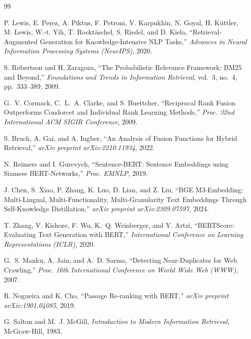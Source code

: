 \documentclass[12pt, a4paper]{article}
\begin{document}
\newpage
\begin{thebibliography}{99}

P. Lewis, E. Perez, A. Piktus, F. Petroni, V. Karpukhin, N. Goyal, H. K{\"u}ttler,
M. Lewis, W.-t. Yih, T. Rockt{\"a}schel, S. Riedel, and D. Kiela,
``Retrieval-Augmented Generation for Knowledge-Intensive NLP Tasks,''
\textit{Advances in Neural Information Processing Systems (NeurIPS)}, 2020.

S. Robertson and H. Zaragoza,
``The Probabilistic Relevance Framework: BM25 and Beyond,''
\textit{Foundations and Trends in Information Retrieval},
vol.~3, no.~4, pp.~333--389, 2009.

G.~V. Cormack, C.~L.~A. Clarke, and S. Buettcher,
``Reciprocal Rank Fusion Outperforms Condorcet and Individual Rank Learning Methods,''
\textit{Proc. 32nd International ACM SIGIR Conference}, 2009.

S. Bruch, A. Gai, and A. Ingber,
``An Analysis of Fusion Functions for Hybrid Retrieval,''
\textit{arXiv preprint arXiv:2210.11934}, 2022.

N. Reimers and I. Gurevych,
``Sentence-BERT: Sentence Embeddings using Siamese BERT-Networks,''
\textit{Proc. EMNLP}, 2019.

J. Chen, S. Xiao, P. Zhang, K. Luo, D. Lian, and Z. Liu,
``BGE M3-Embedding: Multi-Lingual, Multi-Functionality, Multi-Granularity
Text Embeddings Through Self-Knowledge Distillation,''
\textit{arXiv preprint arXiv:2309.07597}, 2024.

T. Zhang, V. Kishore, F. Wu, K.~Q. Weinberger, and Y. Artzi,
``BERTScore: Evaluating Text Generation with BERT,''
\textit{International Conference on Learning Representations (ICLR)}, 2020.

G.~S. Manku, A. Jain, and A.~D. Sarma,
``Detecting Near-Duplicates for Web Crawling,''
\textit{Proc. 16th International Conference on World Wide Web (WWW)}, 2007.

R. Nogueira and K. Cho,
``Passage Re-ranking with BERT,''
\textit{arXiv preprint arXiv:1901.04085}, 2019.

G. Salton and M.~J. McGill,
\textit{Introduction to Modern Information Retrieval},
McGraw-Hill, 1983.


\end{thebibliography}
\end{document}
